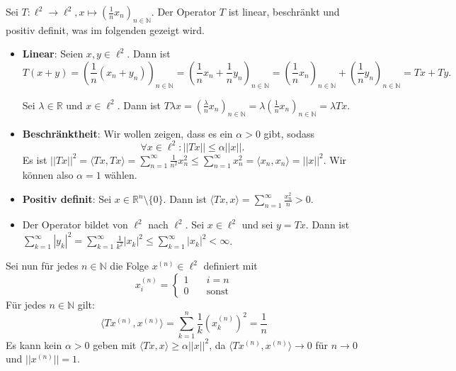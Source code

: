 \documentclass[a4paper, landscape,twocolumn,fontsize=9pt]{scrartcl}
\begin{document}
Sei $T: \ell^2 \to \ell^2, x \mapsto (\frac{1}{n}x_n)_{n \in \mathbb N}$. Der Operator $T$ ist linear, beschränkt und positiv definit, was im folgenden gezeigt wird.
\begin{itemize}
	\item \textbf{Linear}: Seien $x,y \in \ell^2$. Dann ist $$T(x+y) = (\frac{1}{n}(x_n + y_n))_{n \in \mathbb N} = (\frac{1}{n}x_n + \frac{1}{n}y_n)_{n \in \mathbb N} = (\frac{1}{n}x_n)_{n \in \mathbb N} + (\frac{1}{n}y_n)_{n \in \mathbb N} = Tx + Ty.$$

	Sei $\lambda \in \mathbb R$ und $x \in \ell^2$. Dann ist $T\lambda x = (\frac{\lambda}{n}x_n)_{n \in \mathbb N} = \lambda (\frac{1}{n} x_n)_{n \in \mathbb N} = \lambda Tx$.
	
	\item \textbf{Beschränktheit}: Wir wollen zeigen, dass es ein $\alpha > 0$ gibt, sodass
	\[
		\forall x \in \mathbb \ell^2: ||Tx|| \leq \alpha ||x||.
	\]
	Es ist $||Tx||^2 = \langle Tx, Tx \rangle = \sum^\infty_{n=1} \frac{1}{n^2}x_n^2 \leq \sum^\infty_{n=1} x_n^2 = \langle x_n, x_n \rangle = ||x||^2$. Wir können also $\alpha = 1$ wählen.
	
	\item \textbf{Positiv definit}:  Sei $x \in \mathbb R^n \setminus \{ 0 \}$. Dann ist $\langle Tx,x \rangle = \sum^\infty_{n = 1}\frac{x_n^2}{n} > 0$.

	\item Der Operator bildet von $\ell^2$ nach $\ell^2$. Sei $x \in \ell^2$ und sei $y = Tx$. Dann ist $\sum^\infty_{k=1} |y_k|^2 = \sum^\infty_{k=1} \frac{1}{k^2}|x_k|^2 \leq \sum^\infty_{k=1} |x_k|^2 < \infty$. 
\end{itemize} 
Sei nun für jedes $n\in \mathbb N$ die Folge $x^{(n)} \in \ell^2$ definiert mit $$x_i^{(n)} = \begin{cases}
	1 \quad & i = n \\
	0 & \text{sonst}
\end{cases}$$ 
Für jedes $n \in \mathbb N$ gilt: $$\langle Tx^{(n)},x^{(n)} \rangle = \sum^n_{k=1}\frac{1}{k}\left(x^{(n)}_k\right)^2 = \frac{1}{n}$$ 
Es kann kein $\alpha > 0$ geben mit $\langle Tx,x \rangle \geq \alpha ||x||^2$, da $\langle Tx^{(n)},x^{(n)} \rangle \to 0$ für $n \to 0$ und $||x^{(n)}|| = 1$.
\end{document}
